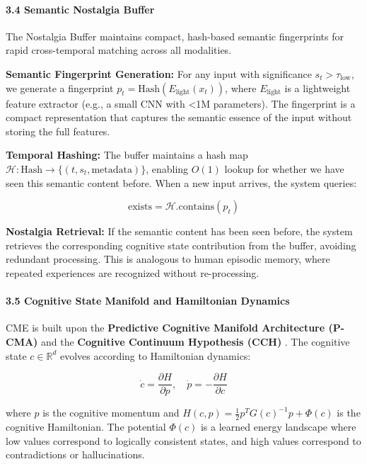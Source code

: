 \documentclass[
  11pt,
  a4paper,
]{article}
\begin{document}
\paragraph{3.4 Semantic Nostalgia
Buffer}\label{semantic-nostalgia-buffer}

The Nostalgia Buffer maintains compact, hash-based semantic fingerprints
for rapid cross-temporal matching across all modalities.

\textbf{Semantic Fingerprint Generation:} For any input with
significance \(s_t > \tau_{\text{low}}\), we generate a fingerprint
\(p_t = \text{Hash}(E_{\text{light}}(x_t))\), where \(E_{\text{light}}\)
is a lightweight feature extractor (e.g., a small CNN with \textless1M
parameters). The fingerprint is a compact representation that captures
the semantic essence of the input without storing the full features.

\textbf{Temporal Hashing:} The buffer maintains a hash map
\(\mathcal{H}: \text{Hash} \to \{(t, s_t, \text{metadata})\}\), enabling
\(O(1)\) lookup for whether we have seen this semantic content before.
When a new input arrives, the system queries:

\[
\text{exists} = \mathcal{H}.\text{contains}(p_t)
\]

\textbf{Nostalgia Retrieval:} If the semantic content has been seen
before, the system retrieves the corresponding cognitive state
contribution from the buffer, avoiding redundant processing. This is
analogous to human episodic memory, where repeated experiences are
recognized without re-processing.

\paragraph{3.5 Cognitive State Manifold and Hamiltonian
Dynamics}\label{cognitive-state-manifold-and-hamiltonian-dynamics}

CME is built upon the \textbf{Predictive Cognitive Manifold Architecture
(P-CMA)} and the \textbf{Cognitive Continuum Hypothesis (CCH)} . The
cognitive state \(c \in \mathbb{R}^{d}\) evolves according to
Hamiltonian dynamics:

\[
\dot{c} = \frac{\partial H}{\partial p}, \quad \dot{p} = -\frac{\partial H}{\partial c}
\]

where \(p\) is the cognitive momentum and
\(H(c, p) = \frac{1}{2} p^T G(c)^{-1} p + \Phi(c)\) is the cognitive
Hamiltonian. The potential \(\Phi(c)\) is a learned energy landscape
where low values correspond to logically consistent states, and high
values correspond to contradictions or hallucinations.
\end{document}
